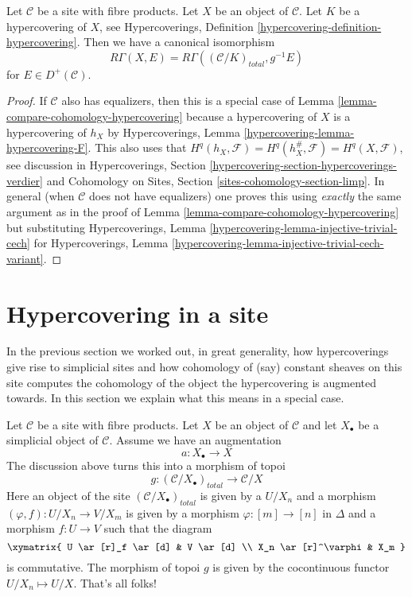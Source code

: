 \begin{lemma}
\label{lemma-compare-cohomology-hypercovering-X}
Let $\mathcal{C}$ be a site with fibre products. Let $X$ be an object of
$\mathcal{C}$. Let $K$ be a hypercovering of $X$, see
Hypercoverings, Definition
\ref{hypercovering-definition-hypercovering}.
Then we have a canonical isomorphism
$$
R\Gamma(X, E) =
R\Gamma((\mathcal{C}/K)_{total}, g^{-1}E)
$$
for $E \in D^+(\mathcal{C})$.
\end{lemma}

\begin{proof}
If $\mathcal{C}$ also has equalizers, then this is a special case of
Lemma \ref{lemma-compare-cohomology-hypercovering}
because a hypercovering of $X$ is a hypercovering of $h_X$ by
Hypercoverings, Lemma \ref{hypercovering-lemma-hypercovering-F}.
This also uses that
$H^q(h_X, \mathcal{F}) = H^q(h_X^\#, \mathcal{F}) = H^q(X, \mathcal{F})$,
see discussion in
Hypercoverings, Section \ref{hypercovering-section-hypercoverings-verdier}
and
Cohomology on Sites, Section \ref{sites-cohomology-section-limp}.
In general (when $\mathcal{C}$ does not have equalizers) one proves
this using {\it exactly} the same argument as in the proof of
Lemma \ref{lemma-compare-cohomology-hypercovering}
but substituting
Hypercoverings, Lemma \ref{hypercovering-lemma-injective-trivial-cech}
for
Hypercoverings, Lemma \ref{hypercovering-lemma-injective-trivial-cech-variant}.
\end{proof}






\section{Hypercovering in a site}
\label{section-hypercovering}

\noindent
In the previous section we worked out, in great generality, how
hypercoverings give rise to simplicial sites and how cohomology
of (say) constant sheaves on this site computes the cohomology
of the object the hypercovering is augmented towards. In this section
we explain what this means in a special case.

\medskip\noindent
Let $\mathcal{C}$ be a site with fibre products. Let $X$ be an object of
$\mathcal{C}$ and let $X_\bullet$ be a simplicial object of $\mathcal{C}$.
Assume we have an augmentation
$$
a : X_\bullet \to X
$$
The discussion above turns this into a morphism of topoi
$$
g : (\mathcal{C}/X_\bullet)_{total} \longrightarrow \mathcal{C}/X
$$
Here an object of the site $(\mathcal{C}/X_\bullet)_{total}$ is given by
a $U/X_n$ and a morphism $(\varphi, f) : U/X_n \to V/X_m$ is given
by a morphism $\varphi : [m] \to [n]$ in $\Delta$ and a morphism
$f : U \to V$ such that the diagram
$$
\xymatrix{
U \ar[r]_f \ar[d] & V \ar[d] \\
X_n \ar[r]^\varphi & X_m
}
$$
is commutative. The morphism of topoi $g$ is given by the cocontinuous
functor $U/X_n \mapsto U/X$. That's all folks!

